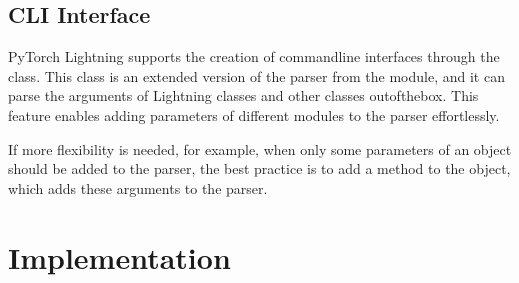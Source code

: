\documentclass[letterpaper,10pt,english]{jupyterBook}
\begin{document}
\subsection{CLI Interface}
\label{\detokenize{PyTorchLightning:cli-interface}}
\sphinxAtStartPar
PyTorch Lightning supports the creation of command\sphinxhyphen{}line interfaces through the  class.
This class is an extended version of the parser from the  module, and it can parse the arguments of Lightning classes and other classes out\sphinxhyphen{}of\sphinxhyphen{}the\sphinxhyphen{}box.
This feature enables adding parameters of different modules to the parser effortlessly.

\sphinxAtStartPar
If more flexibility is needed, for example, when only some parameters of an object should be added to the parser, the best practice is to add a method to the object, which adds these arguments to the parser.
\begin{sphinxVerbatimInput}

\begin{sphinxVerbatim}[commandchars=\\\{\}]
 
 
 
  
\end{sphinxVerbatim}
\end{sphinxVerbatimInput}


\section{Implementation}
\label{\detokenize{PyTorchLightning:implementation}}
\end{document}

